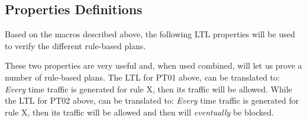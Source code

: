\subsection{Properties Definitions}
\noindent
Based on the macros described above, the following LTL properties will be used to verify the different rule-based plans.  \\

\begin{table}[H]
\begin{center}
\end{center}
\caption{Properties Definitions}
\label{properties}
\end{table}

These two properties are very useful and, when used combined, will let us prove a number of rule-based plans. The LTL for PT01 above, can be translated to: \emph{Every} time traffic is generated for rule X, then its traffic will be allowed. While the LTL for PT02 above, can be translated to: \emph{Every} time traffic is generated for rule X, then its traffic will be allowed and then will \emph{eventually} be blocked. \\

